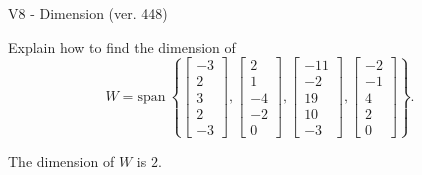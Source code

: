 \begin{exercise}
  \begin{exerciseTitle}V8 - Dimension (ver. 448)\end{exerciseTitle}
  \begin{exerciseStatement}
    Explain how to find the dimension of 
\[W=\mathrm{span}\ \left\{\left[\begin{array}{r}
-3 \\
2 \\
3 \\
2 \\
-3
\end{array}\right] , \left[\begin{array}{r}
2 \\
1 \\
-4 \\
-2 \\
0
\end{array}\right] , \left[\begin{array}{r}
-11 \\
-2 \\
19 \\
10 \\
-3
\end{array}\right] , \left[\begin{array}{r}
-2 \\
-1 \\
4 \\
2 \\
0
\end{array}\right]\right\}.\]



  \end{exerciseStatement}
  \begin{exerciseAnswer}
   The dimension of \(W\) is  \(2\).
  


  \end{exerciseAnswer}
\end{exercise}